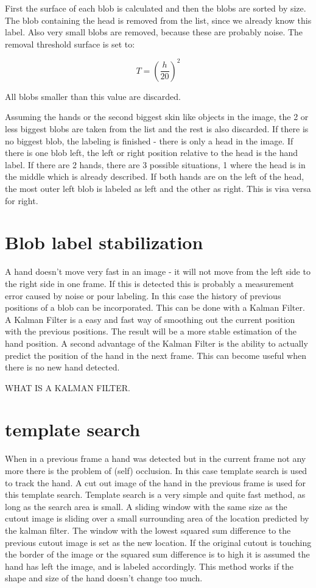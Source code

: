 First the surface of each blob is calculated and then the blobs are sorted by size. The blob containing the head is removed from the list, since we already know this label. Also very small blobs are removed, because these are probably noise. The removal threshold surface is set to:

\begin{equation}
T = (\frac{h}{20})^2
\end{equation}

All blobs smaller than this value are discarded. 

Assuming the hands or the second biggest skin like objects in the image, the 2 or less biggest blobs are taken from the list and the rest is also discarded. If there is no biggest blob, the labeling is finished - there is only a head in the image. If there is one blob left, the left or right position relative to the head is the hand label. If there are 2 hands, there are 3 possible situations, 1 where the head is in the middle which is already described. If both hands are on the left of the head, the most outer left blob is labeled as left and the other as right. This is visa versa for right.


\section{Blob label stabilization}
A hand doesn't move very fast in an image - it will not move from the left side to the right side in one frame. If this is detected this is probably a measurement error caused by noise or pour labeling. In this case the history of previous positions of a blob can be incorporated. This can be done with a Kalman Filter. A Kalman Filter is a easy and fast way of smoothing out the current position with the previous positions. The result will be a more stable estimation of the hand position. A second advantage of the Kalman Filter is the ability to actually predict the position of the hand in the next frame. This can become useful when there is no new hand detected. 

WHAT IS A KALMAN FILTER.

\section{template search}
When in a previous frame a hand was detected but in the current frame not any more there is the problem of (self) occlusion. In this case template search is used to track the hand. A cut out image of the hand in the previous frame is used for this template search. Template search is a very simple and quite fast method, as long as the search area is small. A sliding window  with the same size as the cutout image is sliding over a small surrounding area of the location predicted by the kalman filter. The window with the lowest squared sum difference to the previous cutout image is set as the new location. If the original cutout is touching the border of the image or the squared sum difference is to high it is assumed the hand has left the image, and is labeled accordingly. This method works if the shape and size of the hand doesn't change too much.

